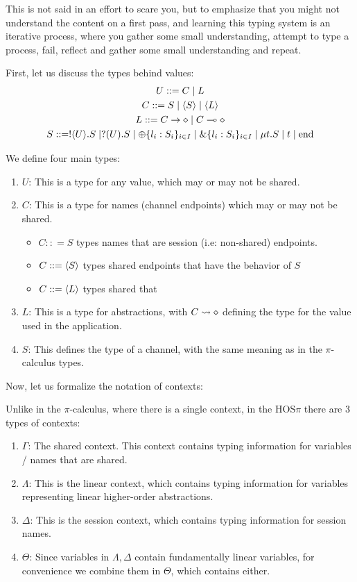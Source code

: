 This is not said in an effort to scare you, but to emphasize that you might not understand the content on a first pass, and learning this typing system is an iterative process, where you gather some small understanding, attempt to type a process, fail, reflect and gather some small understanding and repeat.

First, let us discuss the types behind values:
\begin{gather*}
U ::= C \mid L \\
C ::= S \mid \langle S \rangle \mid \langle L \rangle \\
L ::= C \rightarrow \diamond \mid C \multimap \diamond \\
S ::= !\langle U \rangle . S \mid ?(U).S \mid \oplus \{l_i : S_i\}_{i \in I} \mid \&\{l_i : S_i\}_{i \in I} \mid \mu t. S \mid t \mid \text{end}
\end{gather*}

We define four main types:
\begin{enumerate}
    \item $U$: This is a type for any value, which may or may not be shared.
    \item $C$: This is a type for names (channel endpoints) which may or may not be shared. \begin{itemize}
        \item $C :: = S$ types names that are session (i.e: non-shared) endpoints.
        \item $C ::= \langle S \rangle$ types shared endpoints that have the behavior of $S$ 
        \item $C ::= \langle L \rangle$ types shared that 
    \end{itemize}
    \item $L$: This is a type for abstractions, with $C \leadsto \diamond$ defining the type for the value used in the application.
    \item $S$: This defines the type of a channel, with the same meaning as in the $\pi$-calculus types.
\end{enumerate}


Now, let us formalize the notation of contexts:

Unlike in the $\pi$-calculus, where there is a single context, in the HOS$\pi$ there are 3 types of contexts:
\begin{enumerate}
    \item $\Gamma$: The shared context. This context contains typing information for variables / names that are shared.
    \item $\Lambda$: This is the linear context, which contains typing information for variables representing linear higher-order abstractions.
    \item $\Delta$: This is the session context, which contains typing information for session names.
    \item $\Theta$: Since variables in $\Lambda, \Delta$ contain fundamentally linear variables, for convenience we combine them in $\Theta$, which contains either.
\end{enumerate}

